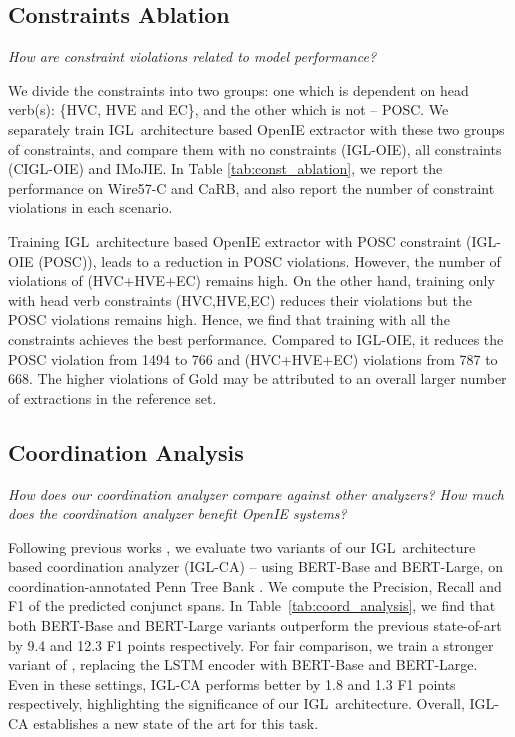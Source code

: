 \documentclass[11pt,a4paper]{article}
\newcommand{\shortname}{{\scshape IGL}}
\begin{document}
\subsection{Constraints Ablation}


\textit{How are constraint violations related to model performance?}

We divide the constraints into two groups: one which is dependent on head verb(s): \{HVC, HVE and EC\}, and the other which is not -- POSC. We separately train \shortname\ architecture based OpenIE extractor with these two groups of constraints, and compare them with no constraints (\shortname-OIE), all constraints (C\shortname-OIE) and IMoJIE. In Table \ref{tab:const_ablation}, we report the performance on Wire57-C and CaRB, and also report the number of constraint violations in each scenario.

Training \shortname\ architecture based OpenIE extractor with POSC constraint (\shortname-OIE (POSC)), leads to a reduction in POSC violations. However, the number of violations of (HVC+HVE+EC) remains high. On the other hand, training only with head verb constraints (HVC,HVE,EC) reduces their violations but the POSC violations remains high. Hence, we find that training with all the constraints achieves the best performance. Compared to \shortname-OIE, it reduces the POSC violation from 1494 to 766 and (HVC+HVE+EC) violations from 787 to 668. The higher violations of Gold may be attributed to an overall larger number of extractions in the reference set.






















\subsection{Coordination Analysis}
\textit{How does our coordination analyzer compare against other analyzers? How much does the coordination analyzer benefit OpenIE systems?}

Following previous works \cite{teranishi+17, teranishi+19}, we evaluate two variants of our \shortname\ architecture based coordination analyzer (\shortname-CA) -- using BERT-Base and BERT-Large, on coordination-annotated Penn Tree Bank \cite{ficler&goldberg16a}. We compute the Precision, Recall and F1 of the predicted conjunct spans. In Table~\ref{tab:coord_analysis}, we find that both BERT-Base and BERT-Large variants outperform the previous state-of-art \cite{teranishi+19} by 9.4 and 12.3 F1 points respectively. For fair comparison, we train a stronger variant of \citet{teranishi+19}, replacing the LSTM encoder with BERT-Base and BERT-Large. Even in these settings, \shortname-CA performs better by 1.8 and 1.3 F1 points respectively, highlighting the significance of our \shortname\ architecture. Overall, \shortname-CA
establishes a new state of the art for this task.
\end{document}
